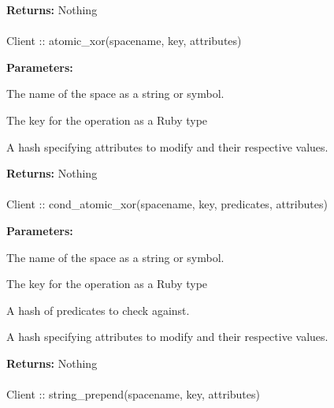 \noindent\textbf{Returns:}
Nothing

\paragraph{}
\begin{ccode}
Client :: atomic_xor(spacename, key, attributes)
\end{ccode}
\funcdesc 

\noindent\textbf{Parameters:}
\begin{description}[labelindent=\widthof{{attributes}},leftmargin=*,noitemsep,nolistsep,align=right]
\item[spacename] The name of the space as a string or symbol.
\item[key] The key for the operation as a Ruby type
\item[attributes] A hash specifying attributes to modify and their respective values.
\end{description}

\noindent\textbf{Returns:}
Nothing

\paragraph{}
\begin{ccode}
Client :: cond_atomic_xor(spacename, key, predicates, attributes)
\end{ccode}
\funcdesc 

\noindent\textbf{Parameters:}
\begin{description}[labelindent=\widthof{{predicates}},leftmargin=*,noitemsep,nolistsep,align=right]
\item[spacename] The name of the space as a string or symbol.
\item[key] The key for the operation as a Ruby type
\item[predicates] A hash of predicates to check against.
\item[attributes] A hash specifying attributes to modify and their respective values.
\end{description}

\noindent\textbf{Returns:}
Nothing

\paragraph{}
\begin{ccode}
Client :: string_prepend(spacename, key, attributes)
\end{ccode}
\funcdesc 


